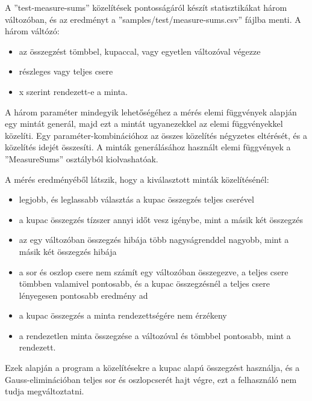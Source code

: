 A ''test-measure-sums'' közelítések pontosságáról készít statisztikákat három változóban, és az eredményt a ''samples/test/measure-sums.csv'' fájlba menti. A három váltózó:
\begin{itemize}
\item az összegzést tömbbel, kupaccal, vagy egyetlen változóval végezze
\item részleges vagy teljes csere
\item x szerint rendezett-e a minta.
\end{itemize}
A három paraméter mindegyik lehetőségéhez a mérés elemi függvények alapján egy mintát generál, majd ezt a mintát ugyanezekkel az elemi függvényekkel közelíti.
Egy paraméter-kombinációhoz az összes közelítés négyzetes eltérését, és a közelítés idejét összesíti.
A minták generálásához használt elemi függvények a ''MeasureSums'' osztályból kiolvashatóak.

A mérés eredményéből látszik, hogy a kiválasztott minták közelítésénél:
\begin{itemize}
\item legjobb, és leglassabb választás a kupac összegzés teljes cserével
\item a kupac összegzés tízszer annyi időt vesz igénybe, mint a másik két összegzés
\item az egy változóban összegzés hibája több nagyságrenddel nagyobb, mint a másik két összegzés hibája
\item a sor és oszlop csere nem számít egy változóban összegezve, a teljes csere tömbben valamivel pontosabb, és a kupac összegzésnél a teljes csere lényegesen pontosabb eredmény ad
\item a kupac összegzés a minta rendezettségére nem érzékeny
\item a rendezetlen minta összegzése a változóval és tömbbel pontosabb, mint a rendezett.
\end{itemize}
Ezek alapján a program a közelítésekre a kupac alapú összegzést használja, és a Gauss-eliminációban teljes sor és oszlopcserét hajt végre, ezt a felhasználó nem tudja megváltoztatni.


